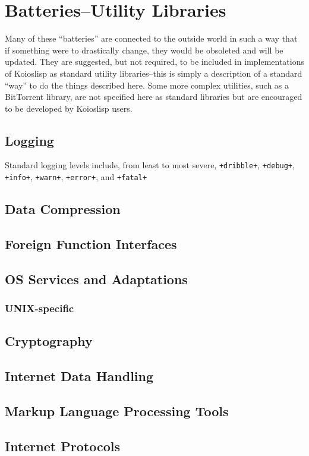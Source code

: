 \documentclass[10pt]{book}
\begin{document}
\chapter{Batteries--Utility Libraries}
Many of these ``batteries'' are connected to the outside world in such a way that if something were to drastically change, they would be obsoleted and will be updated. They are suggested, but not required, to be included in implementations of {\sc Koioslisp} as standard utility libraries--this is simply a description of a standard ``way'' to do the things described here. Some more complex utilities, such as a BitTorrent library, are not specified here as standard libraries but are encouraged to be developed by {\sc Koioslisp} users.
\section{Logging}
Standard logging levels include, from least to most severe, \texttt{+dribble+}, \texttt{+debug+}, \texttt{+info+}, \texttt{+warn+}, \texttt{+error+}, and \texttt{+fatal+}
\section{Data Compression}
\section{Foreign Function Interfaces}
\section{OS Services and Adaptations}
\subsection{UNIX-specific}
\section{Cryptography}
\section{Internet Data Handling}
\section{Markup Language Processing Tools}
\section{Internet Protocols}
\end{document}
